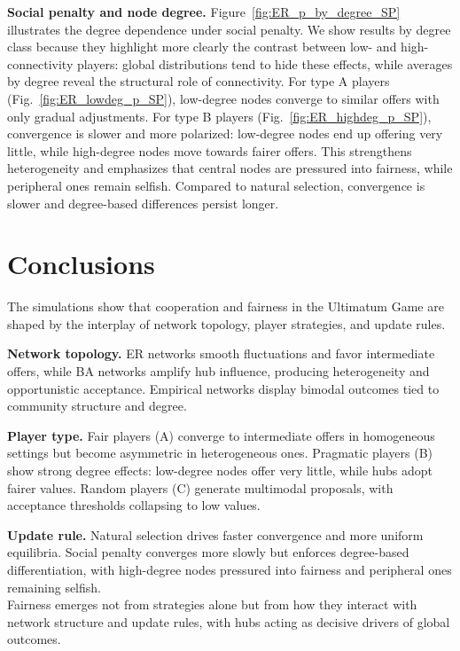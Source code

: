 \noindent\textbf{Social penalty and node degree.}  
Figure~\ref{fig:ER_p_by_degree_SP} illustrates the degree dependence under
social penalty. We show results by degree class because they highlight more
clearly the contrast between low- and high-connectivity players: global
distributions tend to hide these effects, while averages by degree reveal the
structural role of connectivity.  
For type A players (Fig.~\ref{fig:ER_lowdeg_p_SP}), low-degree nodes converge to
similar offers with only gradual adjustments.  
For type B players (Fig.~\ref{fig:ER_highdeg_p_SP}), convergence is slower and
more polarized: low-degree nodes end up offering very little, while high-degree
nodes move towards fairer offers.  
This strengthens heterogeneity and emphasizes that central nodes are pressured
into fairness, while peripheral ones remain selfish. Compared to natural
selection, convergence is slower and degree-based differences persist longer.



\section{Conclusions}

The simulations show that cooperation and fairness in the Ultimatum Game are
shaped by the interplay of network topology, player strategies, and update
rules.

\medskip
\noindent\textbf{Network topology.}  
ER networks smooth fluctuations and favor intermediate offers, while BA networks
amplify hub influence, producing heterogeneity and opportunistic acceptance.
Empirical networks display bimodal outcomes tied to community structure and
degree.

\medskip
\noindent\textbf{Player type.}  
Fair players (A) converge to intermediate offers in homogeneous settings but
become asymmetric in heterogeneous ones.  
Pragmatic players (B) show strong degree effects: low-degree nodes offer very
little, while hubs adopt fairer values.   Random players (C) generate multimodal proposals, with acceptance thresholds collapsing to low values.

\medskip
\noindent\textbf{Update rule.}  
Natural selection drives faster convergence and more uniform equilibria.  
Social penalty converges more slowly but enforces degree-based differentiation,
with high-degree nodes pressured into fairness and peripheral ones remaining
selfish.\\

\noindent\medskip
Fairness emerges not from strategies alone but from how they interact with network structure and update rules, with hubs acting as decisive drivers of global outcomes.

\newpage